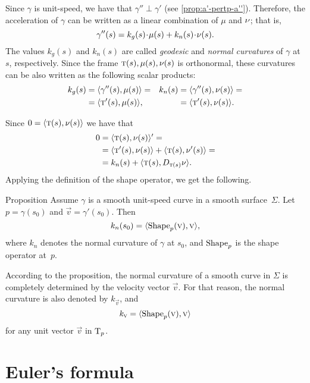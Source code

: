 Since $\gamma$ is unit-speed, we have that $\gamma''\perp \gamma'$ (see \ref{prop:a'-pertp-a''}).
Therefore, the acceleration of $\gamma$ can be written as a linear combination of $\mu$ and $\nu$;
that is, 
\[\gamma''(s)=k_g(s)\cdot \mu(s)+k_n(s)\cdot\Norm(s).\]
The values $k_g(s)$ and $k_n(s)$ are called \emph{geodesic} and \emph{normal curvatures} of $\gamma$ at $s$, respectively.
Since the frame $\text{\sc{t}}(s),\mu(s),\nu(s)$ is orthonormal, these curvatures can be also written as the following scalar products:
\begin{align*}
k_g(s)&=\langle \gamma''(s),\mu(s)\rangle= 
&
k_n(s)&=\langle \gamma''(s),\nu(s)\rangle=
\\
&=\langle \text{\sc{t}}'(s),\mu(s)\rangle,
&
&=\langle \text{\sc{t}}'(s),\nu(s)\rangle.
\end{align*}

Since $0=\langle \text{\sc{t}}(s),\nu(s)\rangle$ we have 
that 
\begin{align*}
0&=\langle \text{\sc{t}}(s),\nu(s)\rangle'=
\\
&=\langle \text{\sc{t}}'(s),\nu(s)\rangle+\langle \text{\sc{t}}(s),\nu'(s)\rangle=
\\
&=k_n(s)+\langle \text{\sc{t}}(s),D_{\text{\sc{t}}(s)}\nu\rangle.
\end{align*}
Applying the definition of the shape operator,
we get the following.

\begin{thm}{Proposition}\label{prop:normal-shape}
Assume $\gamma$ is a smooth unit-speed curve in a smooth surface~$\Sigma$.
Let $p=\gamma(s_0)$ and $\vec v=\gamma'(s_0)$.
Then 
\[k_n(s_0)=\langle \mathop{\rm Shape}\nolimits_p(\text{\sc{v}}),\text{\sc{v}}\rangle,\]
where $k_n$ denotes the normal curvature of $\gamma$ at $s_0$, and $\mathop{\rm Shape}\nolimits_p$ is the shape operator at~$p$.
\end{thm}

According to the proposition, the normal curvature of a smooth curve in $\Sigma$ is completely determined by the velocity vector $\vec v$.
For that reason, the normal curvature is also denoted by $k_{\vec v}$,
and
\[k_{\text{\sc{v}}}=\langle \mathop{\rm Shape}\nolimits_p(\text{\sc{v}}),\text{\sc{v}}\rangle\]
for any unit vector $\vec v$ in $\mathrm{T}_p$.

\section{Euler's formula}

